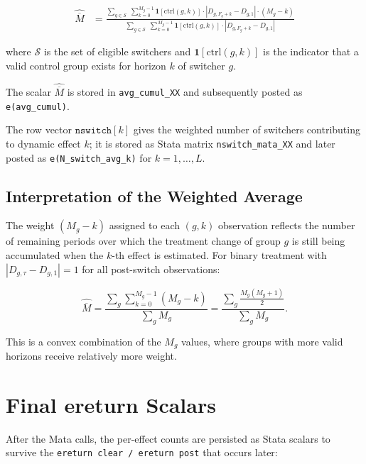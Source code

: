 \documentclass[11pt]{article}
\begin{document}
\begin{align}
  \widehat{\overline{M}}
    &= \frac{\displaystyle\sum_{g \in \mathcal{S}}\;\sum_{k=0}^{M_g-1}
             \mathbf{1}[\text{ctrl}(g,k)]\cdot|D_{g,F_g+k} - D_{g,1}|\cdot(M_g - k)}
            {\displaystyle\sum_{g \in \mathcal{S}}\;\sum_{k=0}^{M_g-1}
             \mathbf{1}[\text{ctrl}(g,k)]\cdot|D_{g,F_g+k} - D_{g,1}|}
  \label{eq:avgM}
\end{align}

where $\mathcal{S}$ is the set of eligible switchers and $\mathbf{1}[\text{ctrl}(g,k)]$
is the indicator that a valid control group exists for horizon $k$ of switcher $g$.

The scalar $\widehat{\overline{M}}$ is stored in \texttt{avg\_cumul\_XX} and
subsequently posted as \texttt{e(avg\_cumul)}.

The row vector $\texttt{nswitch}[k]$ gives the weighted number of switchers
contributing to dynamic effect $k$; it is stored as Stata matrix
\texttt{nswitch\_mata\_XX} and later posted as \texttt{e(N\_switch\_avg\_k)}
for $k = 1,\dots,L$.

\subsection{Interpretation of the Weighted Average}

The weight $(M_g - k)$ assigned to each $(g, k)$ observation reflects the
number of remaining periods over which the treatment change of group $g$ is
still being accumulated when the $k$-th effect is estimated. For binary
treatment with $|D_{g,\tau} - D_{g,1}| = 1$ for all post-switch observations:

\[
  \widehat{\overline{M}}
  = \frac{\sum_g \sum_{k=0}^{M_g-1} (M_g - k)}{\sum_g M_g}
  = \frac{\sum_g \tfrac{M_g(M_g+1)}{2}}{\sum_g M_g}.
\]

This is a convex combination of the $M_g$ values, where groups with more valid
horizons receive relatively more weight.

\section{Final ereturn Scalars}

After the Mata calls, the per-effect counts are persisted as Stata scalars to
survive the \texttt{ereturn clear / ereturn post} that occurs later:
\end{document}
